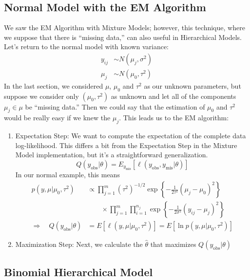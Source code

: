 \documentclass[a4paper,12pt]{scrartcl}
\begin{document}
\newpage
\subsection{Normal Model with the EM Algorithm}

We saw the EM Algorithm with Mixture Models; however, this technique, 
where we suppose that there is ``missing data,''
can also useful in Hierarchical Models.  Let's return to the normal
model with known variance:
\begin{align*}
   y_{ij} &\sim N(\mu_j, \sigma^2) \\
   \mu_j &\sim N(\mu_0, \tau^2) 
\end{align*}
In the last section, we considered $\mu$, $\mu_0$ and $\tau^2$ as our
unknown parameters, but suppose we consider only $(\mu_0, \tau^2)$ as
unknown and let all of the components $\mu_j \in \mu$ be ``missing
data.'' Then we could say that the estimation of $\mu_0$ and $\tau^2$
would be really easy if we knew the $\mu_j$. This leads us to the
EM algorithm:
\begin{enumerate}
   \item Expectation Step: We want to compute the expectation of the
      complete data log-likelihood. This differs a bit from the 
      Expectation Step in the Mixture Model implementation, but
      it's a straightforward generalization.
      \[ Q(y_{\text{obs}} | \theta) = E_{y_\text{mis}}\left[ 
	 \ell(y_{\text{obs}}, y_{\text{mis}} | \theta) \right]\]
      In our normal example, this means
      \begin{align*}
	 p(y, \mu | \mu_0, \tau^2) &\propto \prod^m_{j=1} 
	    (\tau^2)^{-1/2} \exp\left\{-\frac{1}{2\tau^2} 
	    (\mu_j - \mu_0)^2\right\} \\
	    &\qquad \times \prod^m_{j=1} \prod^{n_j}_{i=1}
	    \exp\left\{ -\frac{1}{2\sigma^2}(y_{ij}-\mu_j)^2\right\} \\
	 \Rightarrow \quad Q(y_{\text{obs}}|\theta)
	    &= E[\ell(y,\mu|\mu_0, \tau^2)] = E[\ln 
	    p(y, \mu | \mu_0, \tau^2)]
      \end{align*}
   \item Maximization Step: Next, we calculate the $\hat{\theta}$ 
      that maximizes $Q(y_{\text{obs}}|\theta)$
\end{enumerate}

\newpage
\subsection{Binomial Hierarchical Model}
\end{document}
